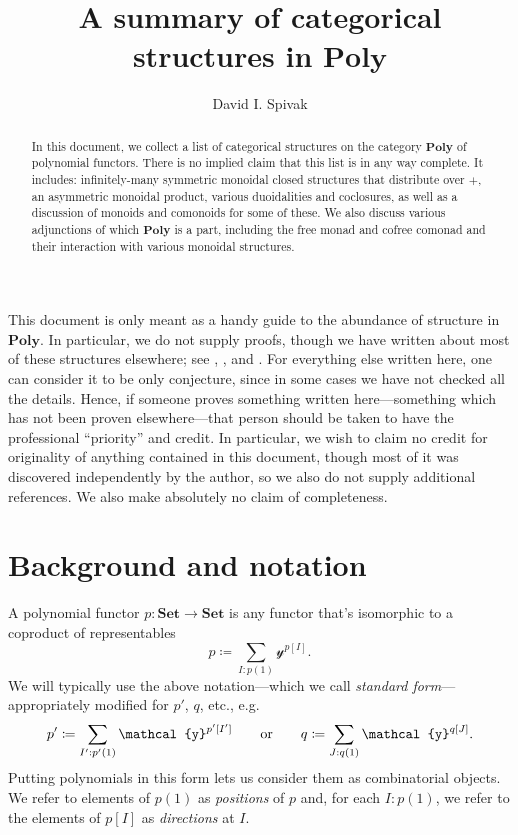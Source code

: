 \documentclass[11pt, one side, article]{memoir}
\theoremstyle{definition}
\theoremstyle{plain}
\newcommand{\Cat}[1]{\mathbf{#1}}%
\newcommand{\tn}[1]{\textnormal{#1}}
\newcommand{\smset}{\Cat{Set}}
\newcommand{\yon}{{\mathcal{y}}}
\newcommand{\poly}{\Cat{Poly}}
\newcommand{\0}{\textsf{0}}
\newcommand{\1}{\tn{\textsf{1}}}
\newcommand{\hh}[2][]{#1 \tn{#2} #1}
\newcommand{\qqor}{\hh[\qquad]{or}}
\begin{document}
\title{A summary of categorical structures in $\poly$}

\author{David I. Spivak}


\maketitle

\begin{abstract}
In this document, we collect a list of categorical structures on the category $\poly$ of polynomial functors. There is no implied claim that this list is in any way complete. It includes: infinitely-many symmetric monoidal closed structures that distribute over $+$, an asymmetric monoidal product, various duoidalities and coclosures, as well as a discussion of monoids and comonoids for some of these. We also discuss various adjunctions of which $\poly$ is a part, including the free monad and cofree comonad and their interaction with various monoidal structures. 
\end{abstract}


\tableofcontents*
\bigskip

This document is only meant as a handy guide to the abundance of structure in $\poly$. In particular, we do not supply proofs, though we have written about most of these structures elsewhere; see \cite{spivak2021functorial}, \cite{niu2022poly}, and \cite{spivak2022polynomial}. For everything else written here, one can consider it to be only conjecture, since in some cases we have not checked all the details. Hence, if someone proves something written here---something which has not been proven elsewhere---that person should be taken to have the professional ``priority'' and credit. In particular, we wish to claim no credit for originality of anything contained in this document, though most of it was discovered independently by the author, so we also do not supply additional references. We also make absolutely no claim of completeness.

\chapter{Background and notation}

A polynomial functor $p\colon\smset\to\smset$ is any functor that's isomorphic to a coproduct of representables
\[
p\coloneqq\sum_{I: p(1)}\yon^{p[I]}.
\]
We will typically use the above notation---which we call \emph{standard form}---appropriately modified for $p'$, $q$, etc., e.g.
\[
p'\coloneqq\sum_{I': p'(1)}\yon^{p'[I']}
\qqor
q\coloneqq\sum_{J: q(1)}\yon^{q[J]}.
\]
Putting polynomials in this form lets us consider them as combinatorial objects. We refer to elements of $p(1)$ as \emph{positions} of $p$ and, for each $I: p(1)$, we refer to the elements of $p[I]$ as \emph{directions} at $I$. 
\end{document}

